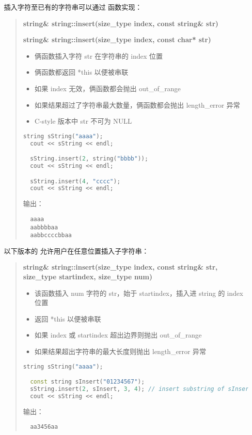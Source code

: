 \documentclass[../../LearnCpp.tex]{subfiles}
\begin{document}

插入字符至已有的字符串可以通过  函数实现：

\begin{quotation}
  \textbf{string\& string::insert(size\_type index, const string\& str)}

  \textbf{string\& string::insert(size\_type index, const char* str)}

  \begin{itemize}
    \item 俩函数插入字符 str 在字符串的 index 位置
    \item 俩函数都返回 *this 以便被串联
    \item 如果 index 无效，俩函数都会抛出 out\_of\_range
    \item 如果结果超过了字符串最大数量，俩函数都会抛出 length\_error 异常
    \item C-style 版本中 str 不可为 NULL
  \end{itemize}

  \begin{lstlisting}[language=C++]
  string sString("aaaa");
  cout << sString << endl;

  sString.insert(2, string("bbbb"));
  cout << sString << endl;

  sString.insert(4, "cccc");
  cout << sString << endl;
  \end{lstlisting}

  输出：

  \begin{lstlisting}
  aaaa
  aabbbbaa
  aabbccccbbaa
  \end{lstlisting}
\end{quotation}

以下版本的  允许用户在任意位置插入子字符串：

\begin{quotation}
  \textbf{string\& string::insert(size\_type index, const string\& str, size\_type startindex, size\_type num)}

  \begin{itemize}
    \item 该函数插入 num 字符的 str，始于 startindex，插入进 string 的 index 位置
    \item 返回 *this 以便被串联
    \item 如果 index 或 startindex 超出边界则抛出 out\_of\_range
    \item 如果结果超出字符串的最大长度则抛出 length\_error 异常
  \end{itemize}

  \begin{lstlisting}[language=C++]
  string sString("aaaa");

  const string sInsert("01234567");
  sString.insert(2, sInsert, 3, 4); // insert substring of sInsert from index [3,7) into sString at index 2
  cout << sString << endl;
  \end{lstlisting}

  输出：

  \begin{lstlisting}
  aa3456aa
  \end{lstlisting}
\end{quotation}
\end{document}
